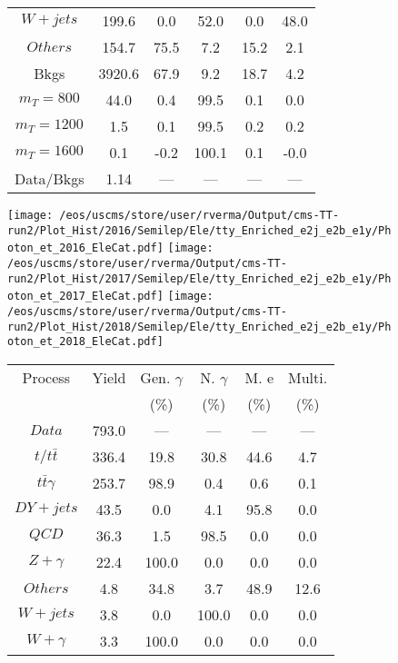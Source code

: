 \begin{figure}
\begin{minipage}[c]{0.32\textwidth}
{\begin{tabular}{cccccc}
$ W+jets $ &  199.6 &  0.0 &  52.0 &  0.0 &  48.0\\
$ Others $ &  154.7 &  75.5 &  7.2 &  15.2 &  2.1\\
Bkgs &  3920.6 &  67.9 &  9.2 &  18.7 &  4.2\\
$ m_{T} = 800 $ &  44.0 &  0.4 &  99.5 &  0.1 &  0.0\\
$ m_{T} = 1200 $ &  1.5 &  0.1 &  99.5 &  0.2 &  0.2\\
$ m_{T} = 1600 $ &  0.1 &  -0.2 &  100.1 &  0.1 &  -0.0\\
Data/Bkgs &  1.14 &  --- &  --- &  --- &  ---\\
\hline
\end{tabular}
}
\end{minipage}
\end{figure}

\begin{figure}
\centering
\texttt{[image: /eos/uscms/store/user/rverma/Output/cms-TT-run2/Plot\_Hist/2016/Semilep/Ele/tty\_Enriched\_e2j\_e2b\_e1y/Photon\_et\_2016\_EleCat.pdf]}
\texttt{[image: /eos/uscms/store/user/rverma/Output/cms-TT-run2/Plot\_Hist/2017/Semilep/Ele/tty\_Enriched\_e2j\_e2b\_e1y/Photon\_et\_2017\_EleCat.pdf]}
\texttt{[image: /eos/uscms/store/user/rverma/Output/cms-TT-run2/Plot\_Hist/2018/Semilep/Ele/tty\_Enriched\_e2j\_e2b\_e1y/Photon\_et\_2018\_EleCat.pdf]}
\begin{minipage}[c]{0.32\textwidth}
\centering
\tiny{
\begin{tabular}{cccccc}
\hline
Process & Yield & Gen. $\gamma$ & N. $\gamma$ & M. e & Multi. \\
 &  & (\%) & (\%) & (\%) & (\%)  \\
\hline
                                                                      $ Data $ &  793.0 &  --- &  --- &  --- &  ---\\
$ t/t\bar{t} $ &  336.4 &  19.8 &  30.8 &  44.6 &  4.7\\
$ t\bar{t}\gamma $ &  253.7 &  98.9 &  0.4 &  0.6 &  0.1\\
$ DY+jets $ &  43.5 &  0.0 &  4.1 &  95.8 &  0.0\\
$ QCD $ &  36.3 &  1.5 &  98.5 &  0.0 &  0.0\\
$ Z+\gamma $ &  22.4 &  100.0 &  0.0 &  0.0 &  0.0\\
$ Others $ &  4.8 &  34.8 &  3.7 &  48.9 &  12.6\\
$ W+jets $ &  3.8 &  0.0 &  100.0 &  0.0 &  0.0\\
$ W+\gamma $ &  3.3 &  100.0 &  0.0 &  0.0 &  0.0\\

\end{tabular}}
\end{minipage}
\end{figure}
